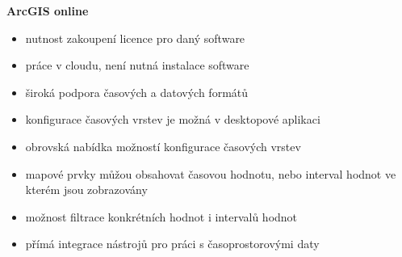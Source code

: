 \textbf{ArcGIS online}
\begin{itemize}
	\item nutnost zakoupení licence pro daný software
	\item práce v cloudu, není nutná instalace software
	\item široká podpora časových a datových formátů
	\item konfigurace časových vrstev je možná v desktopové
aplikaci
	\item obrovská nabídka možností konfigurace časových vrstev
	\item mapové prvky můžou obsahovat časovou hodnotu, nebo
interval hodnot ve kterém jsou zobrazovány
	\item možnost filtrace konkrétních hodnot i intervalů hodnot
	\item přímá integrace nástrojů pro práci s časoprostorovými
daty
\end{itemize}

 




 
